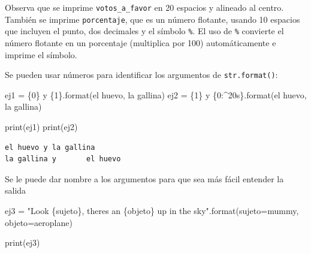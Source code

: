 \documentclass[
  spanish,
  letterpaper,
]{scrbook}
\newenvironment{Shaded}{\begin{snugshade}}{\end{snugshade}}
\newcommand{\BuiltInTok}[1]{\textcolor[rgb]{0.00,0.23,0.31}{#1}}
\newcommand{\NormalTok}[1]{\textcolor[rgb]{0.00,0.23,0.31}{#1}}
\newcommand{\OperatorTok}[1]{\textcolor[rgb]{0.37,0.37,0.37}{#1}}
\newcommand{\SpecialCharTok}[1]{\textcolor[rgb]{0.37,0.37,0.37}{#1}}
\newcommand{\StringTok}[1]{\textcolor[rgb]{0.13,0.47,0.30}{#1}}
\theoremstyle{definition}
\theoremstyle{remark}
\begin{document}
Observa que se imprime \texttt{votos\_a\_favor} en 20 espacios y
alineado al centro. También se imprime \texttt{porcentaje}, que es un
número flotante, usando 10 espacios que incluyen el punto, dos decimales
y el símbolo \texttt{\%}. El uso de \texttt{\%} convierte el número
flotante en un porcentaje (multiplica por 100) automáticamente e imprime
el símbolo.

Se pueden usar números para identificar los argumentos de
\texttt{str.format()}:

\begin{Shaded}
\begin{Highlighting}[]
\NormalTok{ej1 }\OperatorTok{=} \StringTok{\textquotesingle{}}\SpecialCharTok{\{0\}}\StringTok{ y }\SpecialCharTok{\{1\}}\StringTok{\textquotesingle{}}\NormalTok{.}\BuiltInTok{format}\NormalTok{(}\StringTok{\textquotesingle{}el huevo\textquotesingle{}}\NormalTok{, }\StringTok{\textquotesingle{}la gallina\textquotesingle{}}\NormalTok{)}
\NormalTok{ej2 }\OperatorTok{=} \StringTok{\textquotesingle{}}\SpecialCharTok{\{1\}}\StringTok{ y }\SpecialCharTok{\{0:\^{}20s\}}\StringTok{\textquotesingle{}}\NormalTok{.}\BuiltInTok{format}\NormalTok{(}\StringTok{\textquotesingle{}el huevo\textquotesingle{}}\NormalTok{, }\StringTok{\textquotesingle{}la gallina\textquotesingle{}}\NormalTok{)}

\BuiltInTok{print}\NormalTok{(ej1)}
\BuiltInTok{print}\NormalTok{(ej2)}
\end{Highlighting}
\end{Shaded}

\begin{verbatim}
el huevo y la gallina
la gallina y       el huevo      
\end{verbatim}

Se le puede dar nombre a los argumentos para que sea más fácil entender
la salida

\begin{Shaded}
\begin{Highlighting}[]
\NormalTok{ej3 }\OperatorTok{=} \StringTok{"Look }\SpecialCharTok{\{sujeto\}}\StringTok{, there\textquotesingle{}s an }\SpecialCharTok{\{objeto\}}\StringTok{ up in the sky"}\NormalTok{.}\BuiltInTok{format}\NormalTok{(sujeto}\OperatorTok{=}\StringTok{\textquotesingle{}mummy\textquotesingle{}}\NormalTok{, objeto}\OperatorTok{=}\StringTok{\textquotesingle{}aeroplane\textquotesingle{}}\NormalTok{)}

\BuiltInTok{print}\NormalTok{(ej3)}
\end{Highlighting}
\end{Shaded}
\end{document}
